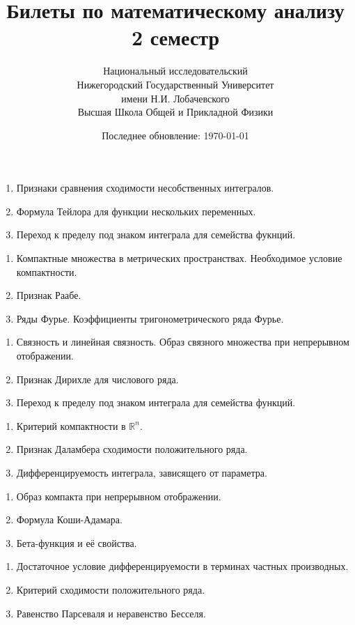 \documentclass{article}
\title{Билеты по математическому анализу \\ 2 семестр}
\date{Последнее обновление: \today}
\author{Национальный исследовательский \\
Нижегородский Государственный Университет \\
имени Н.И. Лобачевского \vspace{0.5em} \\
Высшая Школа Общей и Прикладной Физики \vspace{0.5em}}
\newcounter{ticket}[subsection]
\newenvironment{ticket}[1][]{\item[Билет \ifthenelse{\equal{#1}{}}{}{\setcounter{ticket}{#1}}\theticket\refstepcounter{ticket}:]\phantom{}\begin{enumerate}}{\end{enumerate}}
\begin{document}
\maketitle
\begin{description}
	\begin{ticket}[1]
		\item Признаки сравнения сходимости несобственных интегралов.
		\item Формула Тейлора для функции нескольких переменных.
		\item Переход к пределу под знаком интеграла для
		      семейства фукнций.
	\end{ticket}
	\begin{ticket}[4]
		\item Компактные множества в метрических пространствах.
		      Необходимое условие компактности.
		\item Признак Раабе.
		\item Ряды Фурье. Коэффициенты тригонометрического ряда Фурье.
	\end{ticket}
	\begin{ticket}
		\item Связность и линейная связность. Образ связного множества
		      при непрерывном отображении.
		\item Признак Дирихле для числового ряда.
		\item Переход к пределу под знаком интеграла для
		      семейства функций.
	\end{ticket}
	\begin{ticket}
		\item Критерий компактности в $\mathbb{R}^n$.
		\item Признак Даламбера сходимости положительного ряда.
		\item Дифференцируемость интеграла, зависящего от параметра.
	\end{ticket}
	\begin{ticket}
		\item Образ компакта при непрерывном отображении.
		\item Формула Коши-Адамара.
		\item Бета-функция и её свойства.
	\end{ticket}
	\begin{ticket}
		\item Достаточное условие дифференцируемости в терминах
		      частных производных.
		\item Критерий сходимости положительного ряда.
		\item Равенство Парсеваля и неравенство Бесселя.

\end{ticket}
\end{description}
\end{document}
